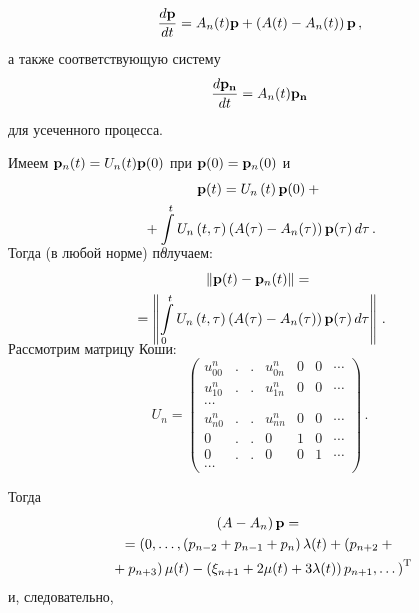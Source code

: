 \begin{multicols}{2}
\noindent
\begin{equation*}
\displaystyle\frac{\displaystyle d\mathbf{p}\mathstrut}{\displaystyle dt\mathstrut}=A_n(t) \mathbf{p}  +\left(A(t) -
A_n(t) \right) \mathbf{p}\,, 
\end{equation*}
а также соответствующую систему
\begin{equation*}
\displaystyle\frac{\displaystyle d\mathbf{p_n}\mathstrut}{\displaystyle dt\mathstrut}=A_n(t) \mathbf{p_n}
\end{equation*}
для усеченного процесса.
\smallskip

Имеем
$ %
{\bf p}_n (t)= U_n(t){\bf p} (0)
$ %
при ${\bf p} (0) = {\bf p}_n (0)$ и
\begin{multline*}
{\bf p} (t)= U_n \left(t\right) {\bf p} (0) +{}\\
{}+ \int\limits_0^t U_n \left(t,
\tau\right) \left(A(\tau) - A_n(\tau) \right) {\bf p} (\tau)\,
d\tau\,. \\[-15pt]
\end{multline*}
Тогда (в любой норме) получаем:
\begin{multline*}
\left\|{\bf p} (t) - {\bf p}_n (t)\right\| ={}\\
{}= \left\|\int\limits_0^t
U_n \left(t,
 \tau\right) \left(A(\tau) - A_n(\tau) \right) {\bf p} (\tau)\, d\tau \right\|\,.\\[-15pt]
\end{multline*}

Рассмотрим матрицу Коши:
\begin{equation*}
U_n =\begin{pmatrix}
  u_{00}^n & . & . & u_{0n}^n  & 0 & 0 & \cdots \\
u_{10}^n & . & . & u_{1n}^n  & 0 & 0 & \cdots \\
\cdots \\
u_{n0}^n & . & . & u_{nn}^n  & 0 & 0 & \cdots \\
0 & . & . & 0 & 1 & 0 & \cdots \\
0 & . & . & 0 & 0 & 1 & \cdots \\
\cdots
\end{pmatrix}\,.
\end{equation*}

\vspace*{-13pt}

\noindent
Тогда\\[-17pt]
\begin{multline*}
\left(A -A_n\right) {\bf p} ={}
\\
{}
= \left(
0,\dots, \left(p_{n-2}+p_{n-1} +p_n\right)\lambda(t)+\left(p_{n+2}+{}\right.\right.\\
\left.\left.{}+p_{n+3}\right)\mu(t)-
\left(\xi_{n+1}+2\mu(t)+3\lambda(t)\right)p_{n+1}, \dots \right)^{\mathrm{T}}
\end{multline*}
и, следовательно,
\end{multicols}

